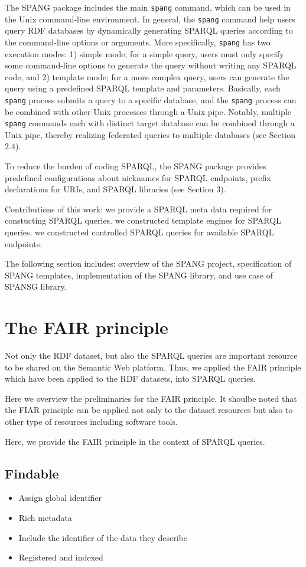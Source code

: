 \documentclass[runningheads]{llncs}
\begin{document}
The SPANG package includes the main {\tt spang} command, which can be used in the Unix command-line environment.
In general, the {\tt spang} command help users query RDF databases by dynamically generating SPARQL queries according to the command-line options or arguments. 
More specifically, {\tt spang} has two execution modes: 
1) simple mode; for a simple query, users must only specify some command-line options to generate the query without writing any SPARQL code, and
2) template mode; for a more complex query, users can generate the query using a predefined SPARQL template and parameters.
Basically, each {\tt spang} process submits a query to a specific database,
and the {\tt spang} process can be combined with other Unix processes through a Unix pipe. 
Notably, multiple {\tt spang} commands each with distinct target database can be combined through a Unix pipe, thereby realizing federated queries to multiple databases (see Section 2.4). 

To reduce the burden of coding SPARQL, the SPANG package provides predefined configurations about nicknames for SPARQL endpoints, prefix declarations for URIs, and SPARQL libraries (see Section 3).


Contributions of this work:
we provide a SPARQL meta data required for constucting SPARQL queries.
we constructed template engines for SPARQL queries.
we constructed controlled SPARQL queries for available SPARQL endpoints.


The following section includes: overview of the SPANG project, specification of SPANG templates, implementation of the SPANG library, and use case of SPANSG library.

\section{The FAIR principle}

Not only the RDF dataset, but also the SPARQL queries are important resource to be shared on the Semantic Web platform. Thus, we applied the FAIR principle which have been applied to the RDF datasets, into SPARQL queries.

Here we overview the preliminaries for the FAIR principle.
It shoulbe noted that the FIAR principle can be applied not only to the dataset resources but also to other type of resources including software tools.

Here, we provide the FAIR principle in the context of SPARQL queries.

\subsection{Findable}
\begin{itemize}
    \item Assign global identifier
    \item Rich metadata
    \item Include the identifier of the data they describe
    \item Registered and indexed
\end{itemize}
\end{document}
